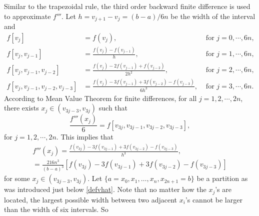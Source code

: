 \documentclass{iitthesis}
\DeclareMathOperator{\Var}{Var}
\theoremstyle{definition}
\theoremstyle{remark}
\begin{document}
Similar to the trapezoidal rule, the third order backward finite difference is used to approximate $f'''$. Let $h=v_{j+1}-v_{j}=(b-a)/6n$ be the width of the interval and
\begin{align*}
  f[v_{j}]&=f(v_{j}), &\text{ for } j=0,\cdots, 6n,\\
  f[v_{j},v_{j-1}]&=\frac{f(v_{j})-f(v_{j-1})}{h},&\text{ for } j=1, \cdots, 6n,\\
  f[v_{j},v_{j-1},v_{j-2}]&=\frac{f(v_{j})-2f(v_{j-1})+f(v_{j-2})}{2h^2},&\text{ for } j=2, \cdots, 6n,\\
  f[v_{j},v_{j-1},v_{j-2},v_{j-3}]&=\frac{f(v_{j})-3f(v_{j-1})+3f(v_{j-2})-f(v_{j-3})}{6h^3}, &\text{ for } j=3, \cdots, 6n.
\end{align*}
According to Mean Value Theorem for finite differences, for all $j=1,2,\cdots,2n$, there exists $x_j\in (v_{3j-3},v_{3j})$ such that
\begin{equation*}
    \frac{f'''(x_j)}{6}=f[v_{3j},v_{3j-1},v_{3j-2},v_{3j-3}],
\end{equation*}
for $j = 1, 2, \cdots, 2n.$ This implies that
\begin{multline}\label{ftriprime}
  f'''(x_j)=\frac{f(v_{3j})-3f(v_{3j-1})+3f(v_{3j-2})-f(v_{3j-3})}{h^3},\\=\frac{216n^3}{(b-a)^3}[f(v_{3j})-3f(v_{3j-1})+3f(v_{3j-2})-f(v_{3j-3})]
\end{multline}
for some $x_j\in (v_{3j-3},v_{3j})$. Let $\{a=x_{0}, x_{1},\ldots,x_{n},x_{2n+1}=b\}$ be a partition as was introduced just below \eqref{defvhat}. Note that no matter how the $x_j$'s are located, the largest possible width between two adjacent $x_{i}$'s cannot be larger than the width of six intervals. So
\end{document}
